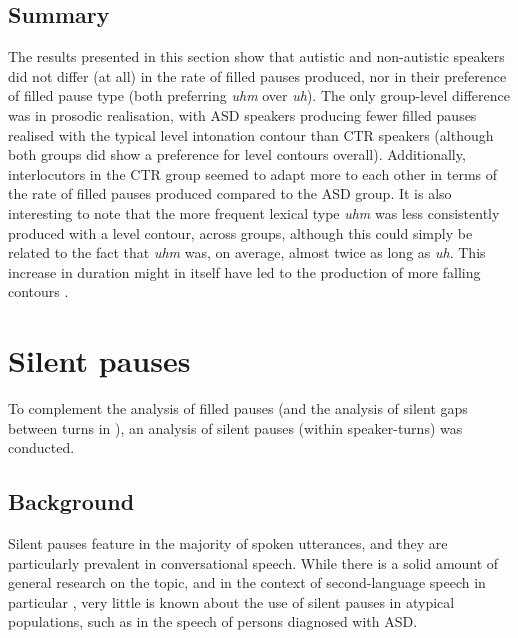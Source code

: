 \subsection{Summary}\label{BCFP_FP_summary}


The results presented in this section show that autistic and non-autistic speakers did not differ (at all) in the rate of filled pauses produced, nor in their preference of filled pause type (both preferring \emph{uhm} over \emph{uh}). The only group-level difference was in prosodic realisation, with ASD speakers producing fewer filled pauses realised with the typical level intonation contour than CTR speakers (although both groups did show a preference for level contours overall). Additionally, interlocutors in the CTR group seemed to adapt more to each other in terms of the rate of filled pauses produced compared to the ASD group. It is also interesting to note that the more frequent lexical type \emph{uhm} was less consistently produced with a level contour, across groups, although this could simply be related to the fact that \emph{uhm} was, on average, almost twice as long as \emph{uh}. This increase in duration might in itself have led to the production of more falling contours \citep[see  and][]{fuchsAssessingRespiratoryContributions2015,gussenhovenFundamentalFrequencyDeclination1988}.













\section{Silent pauses}\label{sec:BCFP_FP_silent}

To complement the analysis of filled pauses (and the analysis of silent gaps between turns in ), an analysis of silent pauses (within speaker-turns) was conducted.

\subsection{Background}\label{BCFP_FP_silent_background}

Silent pauses feature in the majority of spoken utterances, and they are particularly prevalent in conversational speech. While there is a solid amount of general research on the topic, and in the context of second-language speech in particular \citep{bradlowLanguageindependentTalkerspecificityFirstlanguage2017,dejongChoosingThresholdSilent2013}, very little is known about the use of silent pauses in atypical populations, such as in the speech of persons diagnosed with ASD.

